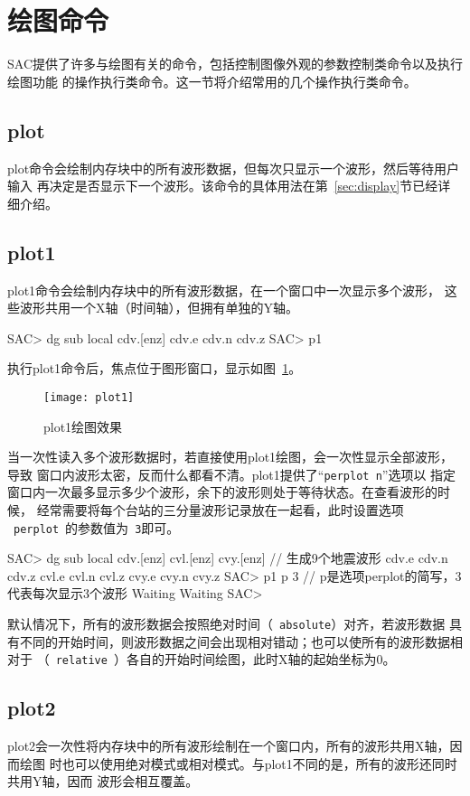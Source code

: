 \section{绘图命令}
SAC提供了许多与绘图有关的命令，包括控制图像外观的参数控制类命令以及执行绘图功能
的操作执行类命令。这一节将介绍常用的几个操作执行类命令。

\subsection{plot}
plot命令会绘制内存块中的所有波形数据，但每次只显示一个波形，然后等待用户输入
再决定是否显示下一个波形。该命令的具体用法在第~\ref{sec:display}节已经详细介绍。

\subsection{plot1}
plot1命令会绘制内存块中的所有波形数据，在一个窗口中一次显示多个波形，
这些波形共用一个X轴（时间轴），但拥有单独的Y轴。

\begin{SACCode}
SAC> dg sub local cdv.[enz]
cdv.e cdv.n cdv.z
SAC> p1
\end{SACCode}

执行plot1命令后，焦点位于图形窗口，显示如图~\ref{fig:plot1}。
\begin{figure}[H]
\centering
\texttt{[image: plot1]}
\caption{plot1绘图效果}
\label{fig:plot1}
\end{figure}

当一次性读入多个波形数据时，若直接使用plot1绘图，会一次性显示全部波形，导致
窗口内波形太密，反而什么都看不清。plot1提供了``\verb+perplot n+''选项以
指定窗口内一次最多显示多少个波形，余下的波形则处于等待状态。在查看波形的时候，
经常需要将每个台站的三分量波形记录放在一起看，此时设置选项
~\verb+perplot+~的参数值为~\verb+3+即可。
\begin{SACCode}
SAC> dg sub local cdv.[enz] cvl.[enz] cvy.[enz]  // 生成9个地震波形
cdv.e cdv.n cdv.z cvl.e cvl.n cvl.z cvy.e cvy.n cvy.z
SAC> p1 p 3         // p是选项perplot的简写，3代表每次显示3个波形
Waiting
Waiting
SAC>
\end{SACCode}

默认情况下，所有的波形数据会按照绝对时间（~\verb+absolute+）对齐，若波形数据
具有不同的开始时间，则波形数据之间会出现相对错动；也可以使所有的波形数据相对于
（~\verb+relative+~）各自的开始时间绘图，此时X轴的起始坐标为0。

\subsection{plot2}
plot2会一次性将内存块中的所有波形绘制在一个窗口内，所有的波形共用X轴，因而绘图
时也可以使用绝对模式或相对模式。与plot1不同的是，所有的波形还同时共用Y轴，因而
波形会相互覆盖。

